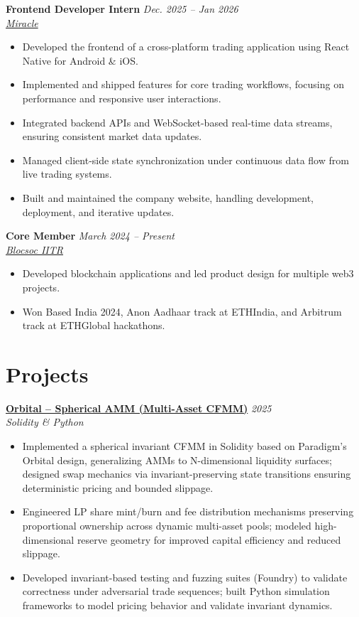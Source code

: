 \documentclass[10pt,a4paper]{article}
\newcommand{\resumeEntry}[3]{
  \noindent\textbf{#1} \hfill \textit{#2} \\   
  \textit{#3} \vspace{-3pt}
}
\newcommand{\entryGap}{\vspace{5pt}}
\begin{document}
\entryGap

\resumeEntry{Frontend Developer Intern}{Dec. 2025 -- Jan 2026}{\href{https://www.miracletrade.com/}{Miracle}}
\begin{itemize}
    \item Developed the frontend of a cross-platform trading application using React Native for Android \& iOS.
    \item Implemented and shipped features for core trading workflows, focusing on performance and responsive user interactions.
    \item Integrated backend APIs and WebSocket-based real-time data streams, ensuring consistent market data updates.
    \item Managed client-side state synchronization under continuous data flow from live trading systems.
    \item Built and maintained the company website, handling development, deployment, and iterative updates.
\end{itemize}

\entryGap

\resumeEntry{Core Member}{March 2024 -- Present}{\href{https://blocsoc.iitr.ac.in/}{Blocsoc IITR}}
\begin{itemize}
    \item Developed blockchain applications and led product design for multiple web3 projects.
    \item Won Based India 2024, Anon Aadhaar track at ETHIndia, and Arbitrum track at ETHGlobal hackathons.
\end{itemize}

\section{Projects}

\resumeEntry{\href{https://github.com/Oxkai/orbital}{Orbital -- Spherical AMM (Multi-Asset CFMM)}}{2025}{Solidity \& Python}
\begin{itemize}
    \item Implemented a spherical invariant CFMM in Solidity based on Paradigm’s Orbital design, generalizing AMMs to N-dimensional liquidity surfaces; designed swap mechanics via invariant-preserving state transitions ensuring deterministic pricing and bounded slippage.
    
    \item Engineered LP share mint/burn and fee distribution mechanisms preserving proportional ownership across dynamic multi-asset pools; modeled high-dimensional reserve geometry for improved capital efficiency and reduced slippage.

    \item Developed invariant-based testing and fuzzing suites (Foundry) to validate correctness under adversarial trade sequences; built Python simulation frameworks to model pricing behavior and validate invariant dynamics.
\end{itemize}
\end{document}
